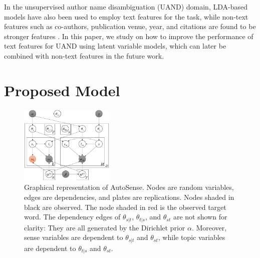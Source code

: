 \documentclass[letterpaper]{article}
\begin{document}
In the unsupervised author name disambiguation (UAND) domain, LDA-based models have also been used \cite{shu2009latent} to employ text features for the task, while non-text features such as co-authors, publication venue, year, and citations are found to be stronger features \cite{tang2012unified}. In this paper, we study on how to improve the performance of text features for UAND using latent variable models, which can later be combined with non-text features in the future work.

\section{Proposed Model}
\begin{figure}[t]
    \centering
    \includegraphics[width=0.4\textwidth]{wpstm}
    \caption{Graphical representation of AutoSense. Nodes are random variables, edges are dependencies, and plates are replications. Nodes shaded in black are observed. The node shaded in red is the observed target word. The dependency edges of $\theta_{s|t}$, $\theta_{t|s}$, and $\theta_{st}$ are not shown for clarity: They are all generated by the Dirichlet prior $\alpha$. Moreover, sense variables are dependent to $\theta_{s|t}$ and $\theta_{st}$, while topic variables are dependent to $\theta_{t|s}$ and $\theta_{st}$.}
    \label{fig:condsptm}
\end{figure}
\end{document}

